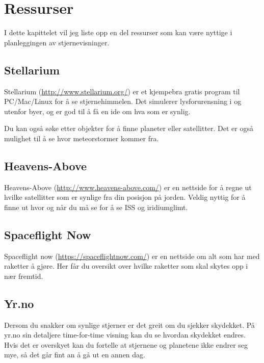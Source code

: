 \documentclass[../SommerstjernerA4.tex]{subfiles}
\begin{document}
\section{Ressurser}
\label{sec:resources}
I dette kapittelet vil jeg liste opp en del ressurser som kan være nyttige i planleggingen av stjernevisninger.

\subsection{Stellarium}
Stellarium (\url{http://www.stellarium.org/}) er et kjempebra gratis program til PC/Mac/Linux for å se stjernehimmelen. Det simulerer lysforurensning i og utenfor byer, og er god til å få en ide om hva som er synlig.

Du kan også søke etter objekter for å finne planeter eller satellitter. Det er også mulighet til å se hvor meteorstormer kommer fra.

\subsection{Heavens-Above}
Heavens-Above (\url{http://www.heavens-above.com/}) er en nettside for å regne ut hvilke satellitter som er synlige fra din posisjon på jorden. Veldig nyttig for å finne ut hvor og når du må se for å se ISS og iridiumglimt.

\subsection{Spaceflight Now}
Spaceflight now (\url{https://spaceflightnow.com/}) er en nettside om alt som har med raketter å gjøre. Her får du oversikt over hvilke raketter som skal skytes opp i nær fremtid.

\subsection{Yr.no}
Dersom du snakker om synlige stjerner er det greit om du sjekker skydekket. På yr.no sin detaljere time-for-time visning kan du se hvordan skydekket endres. Hvis det er overskyet kan du fortelle at stjernene og planetene ikke endrer seg mye, så det går fint an å gå ut en annen dag.
\end{document}
